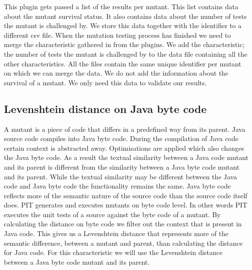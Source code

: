 \documentclass[../../main]{subfiles}
\begin{document}
This plugin gets passed a list of the results per mutant.
This list contains data about the mutant survival status.
It also contains data about the number of tests the mutant is challenged by.
We store this data together with the identifier to a different \acrshort{csv} file.
\newline
When the mutation testing process has finished we need to merge the characteristic gathered in from the plugins.
We add the characteristic; the number of tests the mutant is challenged by to the data file containing all the other characteristics.
All the files contain the same unique identifier per mutant on which we can merge the data.
We do not add the information about the survival of a mutant.
We only need this data to validate our results. 


\subsection{Levenshtein distance on Java byte code}
A mutant is a piece of code that differs in a predefined way from its parent.
Java source code compiles into Java byte code.
During the compilation of Java code certain context is abstracted away\cite{byteCodeEngineering}.
Optimisations are applied which also changes the Java byte code\cite{byteCodeEngineering}.
As a result the textual similarity between a Java code mutant and its parent is different from the similarity between a Java byte code mutant and its parent.
While the textual similarity may be different between the Java code and Java byte code the functionality remains the same.
Java byte code reflects more of the semantic nature of the source code than the source code itself does. 
PIT generates and executes mutants on byte code level\cite{pitestBytecode}. 
In other words PIT executes the unit tests of a source against the byte code of a mutant.
\newline
By calculating the distance on byte code we filter out the context that is present in Java code.
This gives us a Levenshtein distance that represents more of the semantic difference, between a mutant and parent, than calculating the distance for Java code.
For this characteristic we will use the Levenshtein distance between a Java byte code mutant and its parent.
\end{document}
